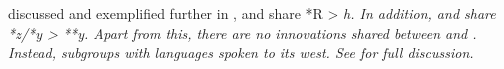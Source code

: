  discussed and exemplified further in ,
 and  share *R > \it{h}.
In addition, 
and  share *z/*y > **y.
Apart from this, there are no innovations
shared between  and .
Instead,  subgroups with  languages spoken to its west.
See  for full discussion.